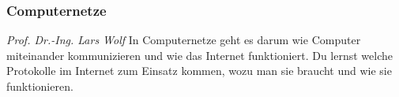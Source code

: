 
\subsubsection{Computernetze}
	\textit{Prof. Dr.-Ing. Lars Wolf}
	In Computernetze geht es darum wie Computer miteinander kommunizieren und wie das Internet funktioniert. Du lernst welche Protokolle im Internet zum Einsatz kommen, wozu man sie braucht und wie sie funktionieren. 